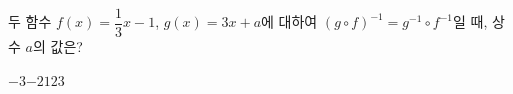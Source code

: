 \hspace*{2mm}\begin{minipage}[t]{\dimexpr\linewidth-2mm\relax}\vspace{0pt}
두 함수 $f(x)=\dfrac{1}{3}x-1$, $g(x)=3x+a$에 대하여 $(g\circ f)^{-1}=g^{-1}\circ f^{-1}$일 때, 상수 $a$의 값은?
\begin{choices32}{$-3$}{$-2$}{$1$}{$2$}{$3$}\end{choices32}\end{minipage}
